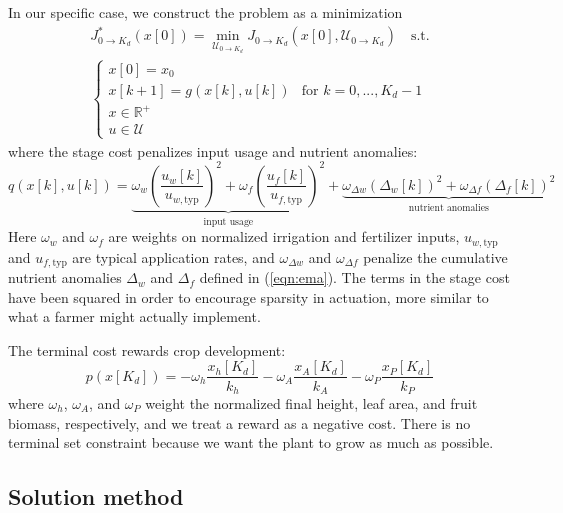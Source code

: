 \documentclass[preprint,12pt]{elsarticle}
\newcommand{\df}[2]{\displaystyle\frac{#1}{#2}}
\begin{document}
In our specific case, we construct the problem as a minimization
\begin{equation}
\begin{array}{c}
J_{0\to K_{d}}^{*}(x[0]) = \min\limits_{\mathcal{U}_{0\to K_{d}}} J_{0\to K_{d}}(x[0], \mathcal{U}_{0\to K_{d}}) \quad \text{s.t.} \\[7pt]
\begin{cases}
x[0] = x_{0} \\
x[k+1] = g(x[k], u[k]) & \text{for } k=0,...,K_{d}-1 \\
x\in\mathbb{R}^{+} \\
u\in{\mathcal{U}}
\end{cases}
\end{array}
\label{eqn:minimization-cftoc}
\end{equation}
where the stage cost penalizes input usage and nutrient anomalies:
\begin{equation}
q(x[k], u[k]) =
\underbrace{\omega_{w}\left( \df{u_{w}[k]}{u_{w,\text{typ}}} \right)^{2} +
\omega_{f}\left( \df{u_{f}[k]}{u_{f,\text{typ}}} \right)^{2}}_{\text{input usage}} +
\underbrace{\omega_{\Delta w}(\Delta_{w}[k])^{2} +
\omega_{\Delta f}(\Delta_{f}[k])^{2}}_{\text{nutrient anomalies}}
\label{eqn:stage-cost}
\end{equation}
Here $\omega_w$ and $\omega_f$ are weights on normalized irrigation and fertilizer inputs, $u_{w,\text{typ}}$ and $u_{f,\text{typ}}$ are typical application rates, and $\omega_{\Delta w}$ and $\omega_{\Delta f}$ penalize the cumulative nutrient anomalies $\Delta_w$ and $\Delta_f$ defined in (\ref{eqn:ema}). The terms in the stage cost have been squared in order to encourage sparsity in actuation, more similar to what a farmer might actually implement. 

The terminal cost rewards crop development:
\begin{equation}
p(x[K_{d}]) =
-\omega_{h}\df{x_{h}[K_{d}]}{k_{h}} -
\omega_{A}\df{x_{A}[K_{d}]}{k_{A}} -
\omega_{P}\df{x_{P}[K_{d}]}{k_{P}}
\label{eqn:terminal-cost}
\end{equation}
where $\omega_h$, $\omega_A$, and $\omega_P$ weight the normalized final height, leaf area, and fruit biomass, respectively, and we treat a reward as a negative cost. There is no terminal set constraint because we want the plant to grow as much as possible. 

\subsection{Solution method}\label{subsec:solution}
\end{document}
